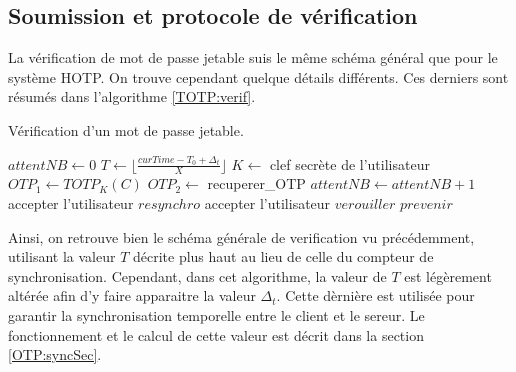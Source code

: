 \documentclass{../res/univ-projet}
\begin{document}
  \subsection{Soumission et protocole de vérification}
    La vérification de mot de passe jetable suis le m\^eme schéma général que pour le système \og{}HOTP\fg{}. On trouve cependant quelque détails différents. Ces derniers 
    sont résumés dans l'algorithme \ref{TOTP:verif}.
    \begin{algorithm}
      \caption{Vérification d'un mot de passe jetable.}
      \label{TOTP:verif}
      
      \begin{algorithmic}
	\STATE $attentNB \leftarrow 0$
	\STATE $T \leftarrow \lfloor{}\frac{curTime - T_0 + \Delta_t}{X}\rfloor{}$
	\STATE $K \leftarrow$ clef secrète de l'utilisateur
	\STATE $OTP_1 \leftarrow TOTP_K(C)$
	  \STATE $OTP_2 \leftarrow$ recuperer\_OTP
	  \STATE $attentNB \leftarrow attentNB + 1$
	    \STATE accepter l'utilisateur
	  \ELSE
	      \STATE $resynchro$
	      \STATE accepter l'utilisateur
	    \ENDIF
	  \ENDIF
	\ENDWHILE
	\STATE $verouiller$
	\STATE $prevenir$
      \end{algorithmic}
    \end{algorithm}
    Ainsi, on retrouve bien le schéma générale de verification vu précédemment, utilisant la valeur $T$ décrite plus haut au lieu de celle du compteur de synchronisation.
    Cependant, dans cet algorithme, la valeur de $T$ est légèrement altérée afin d'y faire apparaitre la valeur $\Delta_t$. Cette dèrnière est utilisée pour garantir la 
    synchronisation temporelle entre le client et le sereur. Le fonctionnement et le calcul de cette valeur est décrit dans la section \ref{OTP:syncSec}.
    
\end{document}
